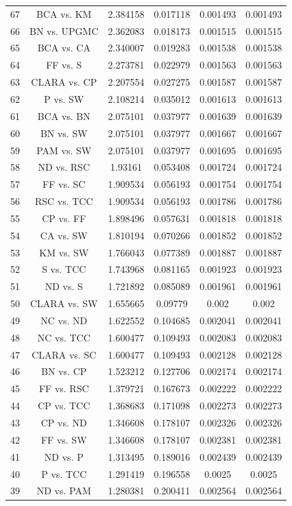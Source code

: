 \documentclass[a4paper,10pt]{article}
\begin{document}
\begin{landscape}
\begin{table}[!htp]
\begin{tabular}{cccccc}
67&BCA vs. KM&2.384158&0.017118&0.001493&0.001493\\
66&BN vs. UPGMC&2.362083&0.018173&0.001515&0.001515\\
65&BCA vs. CA&2.340007&0.019283&0.001538&0.001538\\
64&FF vs. S&2.273781&0.022979&0.001563&0.001563\\
63&CLARA vs. CP&2.207554&0.027275&0.001587&0.001587\\
62&P vs. SW&2.108214&0.035012&0.001613&0.001613\\
61&BCA vs. BN&2.075101&0.037977&0.001639&0.001639\\
60&BN vs. SW&2.075101&0.037977&0.001667&0.001667\\
59&PAM vs. SW&2.075101&0.037977&0.001695&0.001695\\
58&ND vs. RSC&1.93161&0.053408&0.001724&0.001724\\
57&FF vs. SC&1.909534&0.056193&0.001754&0.001754\\
56&RSC vs. TCC&1.909534&0.056193&0.001786&0.001786\\
55&CP vs. FF&1.898496&0.057631&0.001818&0.001818\\
54&CA vs. SW&1.810194&0.070266&0.001852&0.001852\\
53&KM vs. SW&1.766043&0.077389&0.001887&0.001887\\
52&S vs. TCC&1.743968&0.081165&0.001923&0.001923\\
51&ND vs. S&1.721892&0.085089&0.001961&0.001961\\
50&CLARA vs. SW&1.655665&0.09779&0.002&0.002\\
49&NC vs. ND&1.622552&0.104685&0.002041&0.002041\\
48&NC vs. TCC&1.600477&0.109493&0.002083&0.002083\\
47&CLARA vs. SC&1.600477&0.109493&0.002128&0.002128\\
46&BN vs. CP&1.523212&0.127706&0.002174&0.002174\\
45&FF vs. RSC&1.379721&0.167673&0.002222&0.002222\\
44&CP vs. TCC&1.368683&0.171098&0.002273&0.002273\\
43&CP vs. ND&1.346608&0.178107&0.002326&0.002326\\
42&FF vs. SW&1.346608&0.178107&0.002381&0.002381\\
41&ND vs. P&1.313495&0.189016&0.002439&0.002439\\
40&P vs. TCC&1.291419&0.196558&0.0025&0.0025\\
39&ND vs. PAM&1.280381&0.200411&0.002564&0.002564\\

\end{tabular}
\end{table}
\end{landscape}
\end{document}
